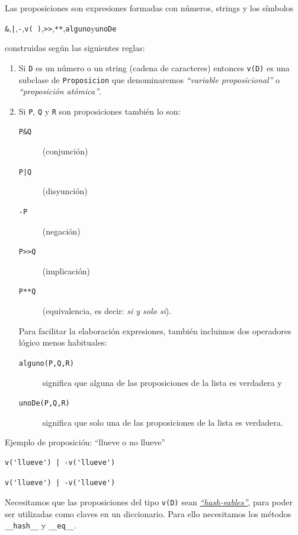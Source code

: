 \documentclass[10pt,a4paper]{report}
\begin{document}
Las proposiciones son expresiones formadas con números, strings y los símbolos
\begin{center}
\texttt{\&},\quad \texttt{|},\quad \texttt{-},\quad  \texttt{v( )},\quad \texttt{>{}>{}},\quad \texttt{**},\quad \texttt{alguno}\quad y\quad  \texttt{unoDe}
\end{center}
construidas según las siguientes reglas:
\begin{enumerate}
\item Si \texttt{D} es un número o un string (cadena de caracteres) entonces \texttt{v(D)} es una
subclase de \texttt{Proposicion} que denominaremos \emph{``variable proposicional''} o \emph{``proposición atómica''}.
\item Si \texttt{P}, \texttt{Q} y \texttt{R} son proposiciones también lo son:
\begin{description}
\item[{\texttt{P\&Q}}] (conjunción)
\item[{\texttt{P|Q}}] (disyunción)
\item[{\texttt{-P}}] (negación)
\item[{\texttt{P>{}>{}Q}}] (implicación)
\item[{\texttt{P**Q}}] (equivalencia, es decir: \emph{si y solo si}).
\end{description}
Para facilitar la elaboración expresiones, también incluimos dos operadores lógico menos habituales:
\begin{description}
\item[{\texttt{alguno(P,Q,R)}}] significa que alguna de las proposiciones de la lista es verdadera y
\item[{\texttt{unoDe(P,Q,R)}}] significa que solo una de las proposiciones de la lista es verdadera.
\end{description}
\end{enumerate}

Ejemplo de proposición: ``llueve o no llueve''
\begin{verbatim}
v('llueve') | -v('llueve')
\end{verbatim}

\label{}
\begin{verbatim}
v('llueve') | -v('llueve')
\end{verbatim}


Necesitamos que las proposiciones del tipo \texttt{v(D)} sean \href{https://docs.python.org/3/glossary.html\#term-hashable}{\emph{``hash-eables''}}, para poder ser utilizadas como claves en un diccionario.
Para ello necesitamos los métodos \texttt{\_\_hash\_\_} y \texttt{\_\_eq\_\_}.
\end{document}
